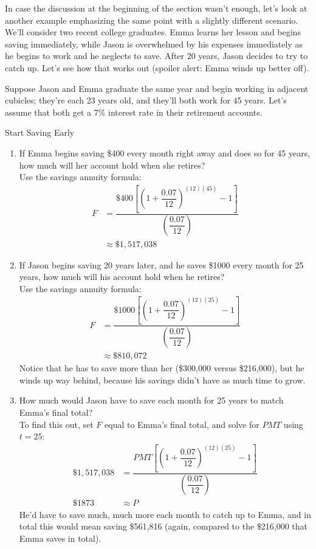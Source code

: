 In case the discussion at the beginning of the section wasn't enough, let's look at another example emphasizing the same point with a slightly different scenario.  We'll consider two recent college graduates.  Emma learns her lesson and begins saving immediately, while Jason is overwhelmed by his expenses immediately as he begins to work and he neglects to save.  After 20 years, Jason decides to try to catch up.  Let's see how that works out (spoiler alert: Emma winds up better off).

Suppose Jason and Emma graduate the same year and begin working in adjacent cubicles; they're each 23 years old, and they'll both work for 45 years.  Let's assume that both get a 7\% interest rate in their retirement accounts. 

\begin{example}[https://www.youtube.com/watch?v=9hcZL9uCEoY]{Start Saving Early}
\begin{enumerate}[(1)]
\item If Emma begins saving \$400 every month right away and does so for 45 years, how much will her account hold when she retires?\\

Use the savings annuity formula:
\begin{align*}
F &= \dfrac{\$400\left[\left(1+\dfrac{0.07}{12}\right)^{(12)(45)}-1\right]}{\left(\dfrac{0.07}{12}\right)}\\
&\approx \boxed{\$1,517,038}
\end{align*}

\item If Jason begins saving 20 years later, and he saves \$1000 every month for 25 years, how much will his account hold when he retires?\\

Use the savings annuity formula:
\begin{align*}
F &= \dfrac{\$1000\left[\left(1+\dfrac{0.07}{12}\right)^{(12)(25)}-1\right]}{\left(\dfrac{0.07}{12}\right)}\\
&\approx \boxed{\$810,072}
\end{align*}
Notice that he has to save more than her (\$300,000 versus \$216,000), but he winds up way behind, because his savings didn't have as much time to grow.

\item How much would Jason have to save each month for 25 years to match Emma's final total?\\

To find this out, set $F$ equal to Emma's final total, and solve for $PMT$ using $t=25$:
\begin{align*}
\$1,517,038 &= \dfrac{PMT\left[\left(1+\dfrac{0.07}{12}\right)^{(12)(25)}-1\right]}{\left(\dfrac{0.07}{12}\right)}\\
\boxed{\$1873} &\approx P
\end{align*}
He'd have to save much, much more each month to catch up to Emma, and in total this would mean saving \$561,816 (again, compared to the \$216,000 that Emma saves in total).


\end{enumerate}
\end{example}
